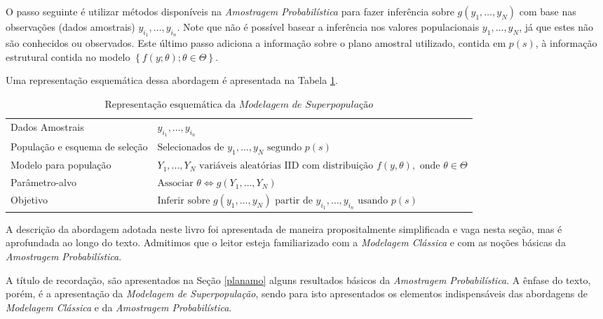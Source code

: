 \documentclass[
  12pt,
  brazilian,
]{book}
\theoremstyle{definition}
\theoremstyle{definition}
\theoremstyle{definition}
\theoremstyle{definition}
\theoremstyle{remark}
\begin{document}
O passo seguinte é utilizar métodos disponíveis na \emph{Amostragem Probabilística} para fazer inferência sobre \(g\left( y_{1}, \ldots , y_{N} \right)\) com base nas observações (dados amostrais) \(y_{i_1}, \ldots , y_{i_n}\). Note que não é possível basear a inferência nos valores populacionais \(y_{1}, \ldots , y_{N}\), já que estes não são conhecidos ou observados. Este último passo adiciona a informação sobre o plano amostral utilizado, contida em \(p(s)\), à informação estrutural contida no modelo \(\left\{ f\left( y; \theta \right) ; \theta \in \Theta \right\}\).

Uma representação esquemática dessa abordagem é apresentada na Tabela
\ref{tab:modelsuperpop}.

\begin{table}[H]

\caption{\label{tab:modelsuperpop}$\text{Representação esquemática da } \textit{Modelagem de Superpopulação}$}
\centering
\begin{tabular}[t]{>{\raggedright\arraybackslash}p{5cm}l}
\toprule
Dados Amostrais & $y_{i_1}, \ldots, y_{i_n}$\\
População e esquema de seleção & $\text{Selecionados de } y_1, \dots, y_N \text{ segundo } p(s)$\\
Modelo para população & $Y_1, \dots, Y_N \text{ variáveis aleatórias IID com distribuição } f(y, \theta),\text { onde } \theta \in \Theta$\\
Parâmetro-alvo & $\text{Associar } \theta\Leftrightarrow g\left (Y_{1},\ldots,Y_{N}\right)$\\
Objetivo & $\text{Inferir sobre }g\left( y_{1}, \ldots , y_{N} \right) \text{ partir de } y_{i_1}, \ldots, y_{i_n} \text{ usando } p(s)$\\
\bottomrule
\end{tabular}
\end{table}

A descrição da abordagem adotada neste livro foi apresentada de maneira
propositalmente simplificada e vaga nesta seção, mas é aprofundada ao longo
do texto. Admitimos que o leitor esteja familiarizado com a \emph{Modelagem Clássica} e com as noções básicas da \emph{Amostragem Probabilística}.

A título de recordação, são apresentados na Seção \ref{planamo} alguns resultados básicos da \emph{Amostragem Probabilística}. A ênfase do texto, porém, é a apresentação da \emph{Modelagem de Superpopulação}, sendo para isto apresentados os elementos indispensáveis das abordagens de \emph{Modelagem Clássica} e da \emph{Amostragem Probabilística}.
\end{document}

